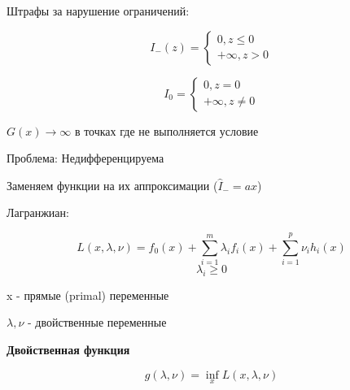 \documentclass[a4paper, 12pt]{article}
\begin{document}
Штрафы за нарушение ограничений:

\[I_{-}(z) = \begin{cases}
    0, z \leq 0 \\
    + \infty, z > 0 
\end{cases}\]

\[I_{0} = \begin{cases}
    0, z = 0 \\
    + \infty, z \neq 0 
\end{cases}\]

\(G(x) \rightarrow \infty\) в точках где не выполняется условие

Проблема: Недифференцируема

Заменяем функции на их аппроксимации ($\hat{I}_{-} = ax$)

Лагранжиан:

\[L(x, \lambda, \nu) = f_0(x) + \sum_{i = 1}^m \lambda_i f_i(x) + \sum_{i = 1}^p \nu_i h_i(x)\]
\[\lambda_i \geq 0\]

x - прямые (primal) переменные

$\lambda, \nu$ - двойственные переменные

\textbf{Двойственная функция}

\[g(\lambda, \nu) = \inf_{x} L(x, \lambda, \nu)\]
\end{document}
